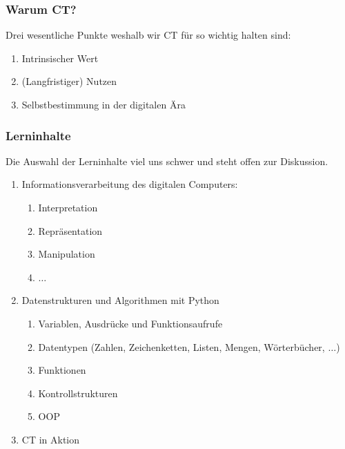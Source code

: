\documentclass[german,aspectratio=169]{beamer}
\begin{document}
\begin{frame}
	\frametitle{Warum CT?}
	Drei wesentliche Punkte weshalb wir CT für so wichtig halten sind:
	\begin{enumerate}[label=(\arabic*)]
		\item Intrinsischer Wert
		\item (Langfristiger) Nutzen
		\item Selbstbestimmung in der digitalen Ära
	\end{enumerate}
\end{frame}

\begin{frame}
	\frametitle{Lerninhalte}
	Die Auswahl der Lerninhalte viel uns schwer und steht offen zur Diskussion.
	\begin{enumerate}[label=(\arabic*)]
		\item Informationsverarbeitung des digitalen Computers: 
		\begin{enumerate}[label=$\bullet$]
			\item Interpretation
			\item Repräsentation
			\item Manipulation
			\item $\ldots$
		\end{enumerate}
		\item Datenstrukturen und Algorithmen mit Python
			\begin{enumerate}[label=$\bullet$]
			\item Variablen, Ausdrücke und Funktionsaufrufe
			\item Datentypen (Zahlen, Zeichenketten, Listen, Mengen, Wörterbücher, $\ldots$)
			\item Funktionen
			\item Kontrollstrukturen
			\item OOP
		\end{enumerate}
		\item CT in Aktion
	\end{enumerate}
\end{frame}
\end{document}
